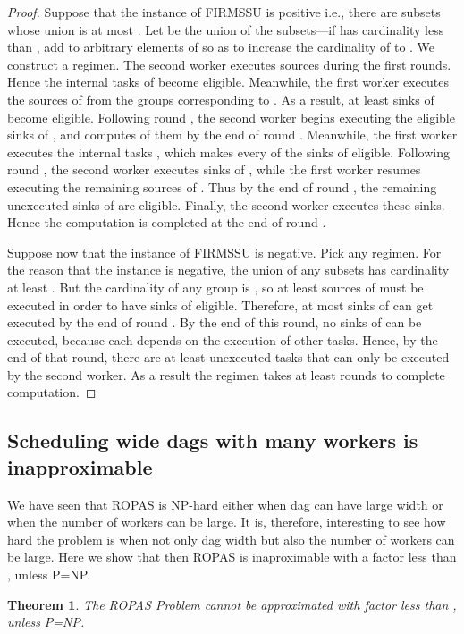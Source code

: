 \documentclass[letterpaper,11pt]{article}
\newtheorem{theorem}{Theorem}[section]
\begin{document}
\begin{proof}
Suppose that the instance of FIRMSSU is positive i.e., there are  subsets whose union is at most . Let  be the union of the  subsets---if  has cardinality less than , add to  arbitrary elements of  so as to increase the cardinality of  to . We construct a regimen. The second worker executes sources  during the first  rounds. Hence the  internal tasks of  become eligible. Meanwhile, the first worker executes the  sources of  from the groups corresponding to . As a result, at least  sinks of  become eligible. Following round , the second worker begins executing the eligible sinks of , and computes  of them by the end of round . Meanwhile, the first worker executes the  internal tasks , which makes every of the  sinks of  eligible. Following round , the second worker executes  sinks of , while the first worker resumes executing the remaining  sources of . Thus by the end of round , the remaining  unexecuted sinks of  are eligible. Finally, the second worker executes these sinks. Hence the computation is completed at the end of round .

Suppose now that the instance of FIRMSSU is negative. Pick any regimen. For the reason that the instance is negative, the union of any  subsets has cardinality at least . But the cardinality of any group is , so at least  sources of  must be executed in order to have  sinks of  eligible. Therefore, at most  sinks of  can get executed by the end of round . By the end of this round, no sinks of  can be executed, because each depends on the execution of  other tasks. Hence, by the end of that round, there are at least  unexecuted tasks that can only be executed by the second worker. As a result the regimen takes at least  rounds to complete computation.
\end{proof}



\subsection{Scheduling wide dags with many workers is inapproximable}

We have seen that ROPAS is NP-hard either when dag can have large width or when the number of workers can be large. It is, therefore, interesting to see how hard the problem is when not only dag width but also the number of workers can be large. Here we show that then ROPAS is inaproximable with a factor less than , unless P=NP.

\begin{theorem}
The ROPAS Problem cannot be approximated with factor less than , unless P=NP.
\end{theorem}
\end{document}
